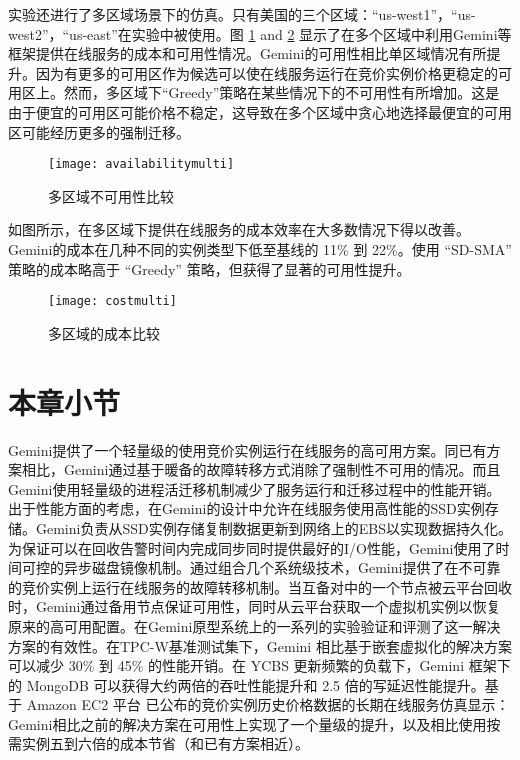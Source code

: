 实验还进行了多区域场景下的仿真。只有美国的三个区域：``us-west1''，``us-west2''，``us-east''在实验中被使用。图 \ref{figure:unavailabilitymulti} and \ref{figure:costmulti} 显示了在多个区域中利用Gemini等框架提供在线服务的成本和可用性情况。Gemini的可用性相比单区域情况有所提升。因为有更多的可用区作为候选可以使在线服务运行在竞价实例价格更稳定的可用区上。然而，多区域下``Greedy''策略在某些情况下的不可用性有所增加。这是由于便宜的可用区可能价格不稳定，这导致在多个区域中贪心地选择最便宜的可用区可能经历更多的强制迁移。
\begin{figure}[]
  \centering
  \texttt{[image: availabilitymulti]}
  \caption{多区域不可用性比较}
  \label{figure:unavailabilitymulti}
\end{figure}

如图所示，在多区域下提供在线服务的成本效率在大多数情况下得以改善。Gemini的成本在几种不同的实例类型下低至基线的 11\% 到 22\%。使用 ``SD-SMA'' 策略的成本略高于 ``Greedy'' 策略，但获得了显著的可用性提升。
\begin{figure}[]
  \centering
  \texttt{[image: costmulti]}
  \caption{多区域的成本比较}
  \label{figure:costmulti}
\end{figure}

\section{本章小节}
Gemini提供了一个轻量级的使用竞价实例运行在线服务的高可用方案。同已有方案相比，Gemini通过基于暖备的故障转移方式消除了强制性不可用的情况。而且Gemini使用轻量级的进程活迁移机制减少了服务运行和迁移过程中的性能开销。出于性能方面的考虑，在Gemini的设计中允许在线服务使用高性能的SSD实例存储。Gemini负责从SSD实例存储复制数据更新到网络上的EBS以实现数据持久化。为保证可以在回收告警时间内完成同步同时提供最好的I/O性能，Gemini使用了时间可控的异步磁盘镜像机制。通过组合几个系统级技术，Gemini提供了在不可靠的竞价实例上运行在线服务的故障转移机制。当互备对中的一个节点被云平台回收时，Gemini通过备用节点保证可用性，同时从云平台获取一个虚拟机实例以恢复原来的高可用配置。在Gemini原型系统上的一系列的实验验证和评测了这一解决方案的有效性。在TPC-W基准测试集下，Gemini 相比基于嵌套虚拟化的解决方案可以减少 30\% 到 45\% 的性能开销。在 YCBS 更新频繁的负载下，Gemini 框架下的 MongoDB 可以获得大约两倍的吞吐性能提升和 2.5 倍的写延迟性能提升。基于 Amazon EC2 平台 已公布的竞价实例历史价格数据的长期在线服务仿真显示：Gemini相比之前的解决方案在可用性上实现了一个量级的提升，以及相比使用按需实例五到六倍的成本节省（和已有方案相近）。